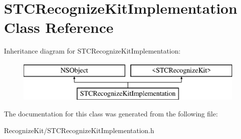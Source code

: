 \hypertarget{interface_s_t_c_recognize_kit_implementation}{}\section{S\+T\+C\+Recognize\+Kit\+Implementation Class Reference}
\label{interface_s_t_c_recognize_kit_implementation}
Inheritance diagram for S\+T\+C\+Recognize\+Kit\+Implementation\+:\begin{figure}[H]
\begin{center}
\leavevmode
\includegraphics[height=2.000000cm]{interface_s_t_c_recognize_kit_implementation}
\end{center}
\end{figure}


The documentation for this class was generated from the following file\+:\begin{DoxyCompactItemize}
\item 
Recognize\+Kit/S\+T\+C\+Recognize\+Kit\+Implementation.\+h\end{DoxyCompactItemize}
